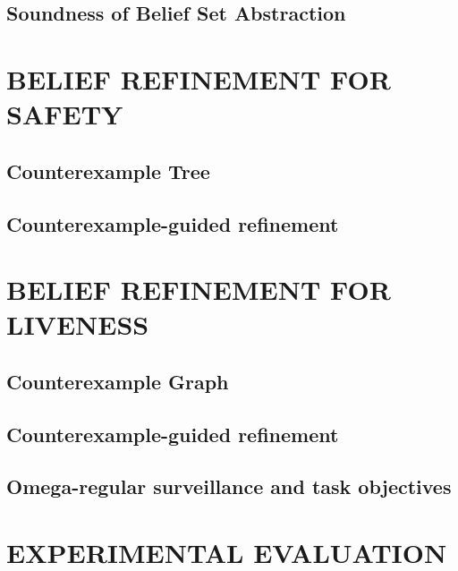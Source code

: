 \documentclass[letterpaper, 10 pt, conference]{ieeeconf}  %
\begin{document}
\subsection{Soundness of Belief Set Abstraction}




\section{BELIEF REFINEMENT FOR SAFETY}%
\subsection{Counterexample Tree}

\subsection{Counterexample-guided refinement}



\section{BELIEF REFINEMENT FOR LIVENESS}%
\subsection{Counterexample Graph}

\subsection{Counterexample-guided refinement}

\subsection{Omega-regular surveillance and task objectives}



\section{EXPERIMENTAL EVALUATION}


\end{document}
